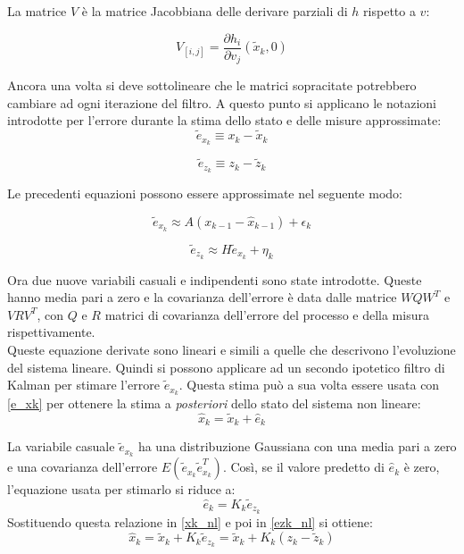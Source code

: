 La matrice $V$ è la matrice Jacobbiana delle derivare parziali di $h$ rispetto a $v$:

\begin{equation}
V_{[i,j]} = \dfrac{\partial h_{i}}{\partial v_j} ( \tilde{x}_k,0)
\end{equation}

Ancora una volta si deve sottolineare che le matrici sopracitate potrebbero cambiare ad ogni iterazione del filtro. A questo punto si applicano le notazioni introdotte per l'errore durante la stima dello stato e delle misure approssimate:
\begin{equation}
\label{e_xk}
\tilde{e}_{x_k} \equiv x_k - \tilde{x}_k
\end{equation}

\begin{equation}
\label{ezk_nl}
\tilde{e}_{z_k} \equiv z_k - \tilde{z}_k
\end{equation}

Le precedenti equazioni possono essere approssimate nel seguente modo:

\begin{equation}
\tilde{e}_{x_k} \approx A(x_{k-1} - \hat{x}_{k-1}) + \epsilon_k
\end{equation}

\begin{equation}
\tilde{e}_{z_k} \approx H \tilde{e}_{x_k} + \eta_k
\end{equation}

Ora due nuove variabili casuali e indipendenti sono state introdotte. Queste hanno media pari a zero e la covarianza dell'errore è data dalle matrice $WQW^T$ e $VRV^T$, con $Q$ e $R$ matrici di covarianza dell'errore del processo e della misura rispettivamente.\\
Queste equazione derivate sono lineari e simili a quelle che descrivono l'evoluzione del sistema lineare. Quindi si possono applicare ad un secondo ipotetico filtro di Kalman per stimare l'errore $\tilde{e}_{x_k}$. Questa stima può a sua volta essere usata con \ref{e_xk} per ottenere la stima a \textit{posteriori} dello stato del sistema non lineare:
\begin{equation}
\label{xk_nl}
\hat{x}_k = \tilde{x}_k + \hat{e}_k
\end{equation}

La variabile casuale $\tilde{e}_{x_k}$ ha una distribuzione Gaussiana con una media pari a zero e una covarianza dell'errore $E(\tilde{e}_{x_k}\tilde{e}_{x_k}^T )$. Così, se il valore predetto di $\hat{e}_k$ è zero, l'equazione usata per stimarlo si riduce a:
\begin{equation}
\hat{e}_k = K_k \tilde{e}_{z_k}
\end{equation}
Sostituendo questa relazione in \ref{xk_nl} e poi in \ref{ezk_nl} si ottiene:
\begin{equation}
\hat{x}_k = \tilde{x}_k + K_k\tilde{e}_{z_k} =  \tilde{x}_k + K_k (z_k - \tilde{z}_k)
\end{equation}

